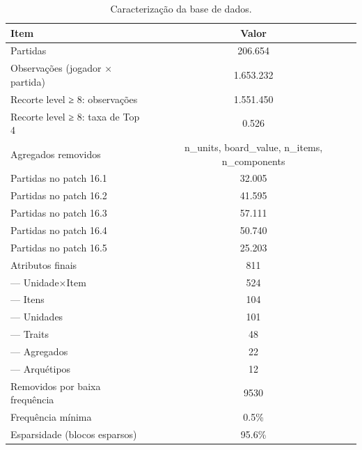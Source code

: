 \begin{table}[htbp]
\caption{Caracterização da base de dados.}
\label{tab:dados}
\centering
\small
\begin{tabular}{lc}
\toprule
Item & Valor \\
\midrule
Partidas & 206.654 \\
Observações (jogador × partida) & 1.653.232 \\
Recorte level ≥ 8: observações & 1.551.450 \\
Recorte level ≥ 8: taxa de Top 4 & 0.526 \\
Agregados removidos & n\_units, board\_value, n\_items, n\_components \\
  Partidas no patch 16.1 & 32.005 \\
  Partidas no patch 16.2 & 41.595 \\
  Partidas no patch 16.3 & 57.111 \\
  Partidas no patch 16.4 & 50.740 \\
  Partidas no patch 16.5 & 25.203 \\
Atributos finais & 811 \\
  — Unidade×Item & 524 \\
  — Itens & 104 \\
  — Unidades & 101 \\
  — Traits & 48 \\
  — Agregados & 22 \\
  — Arquétipos & 12 \\
Removidos por baixa frequência & 9530 \\
Frequência mínima & 0.5\% \\
Esparsidade (blocos esparsos) & 95.6\% \\
\bottomrule
\end{tabular}
\end{table}
